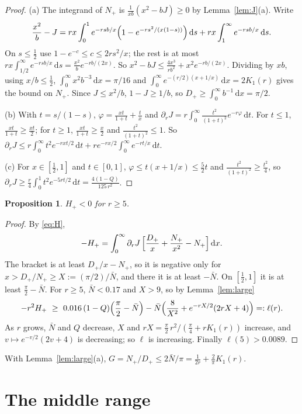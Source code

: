\documentclass[11pt]{amsart}
\newtheorem{proposition}[theorem]{Proposition}
\theoremstyle{remark}
\numberwithin{equation}{section}
\newcommand{\dd}{\,\mathrm{d}}
\begin{document}
\begin{proof}
(a) The integrand of $N_+$ is $\frac1{xb}(x^2-bJ)\ge0$ by Lemma~\ref{lem:J}(a). Write
\[
\frac{x^2}b-J=rx\int_0^1e^{-rsb/x}\Bigl(1-e^{-rs^2/(x(1-s))}\Bigr)\dd s+rx\int_1^\infty e^{-rsb/x}\dd s .
\]
On $s\le\frac12$ use $1-e^{-c}\le c\le2rs^2/x$; the rest is at most $rx\int_{1/2}^\infty e^{-rsb/x}\dd s=\frac{x^2}be^{-rb/(2x)}$. So $x^2-bJ\le\frac{4x^3}{rb^2}+x^2e^{-rb/(2x)}$. Dividing by $xb$, using $x/b\le\frac12$, $\int_0^\infty x^2b^{-3}\dd x=\pi/16$ and $\int_0^\infty e^{-(r/2)(x+1/x)}\dd x=2K_1(r)$ gives the bound on $N_+$. Since $J\le x^2/b$, $1-J\ge1/b$, so $D_+\ge\int_0^\infty b^{-1}\dd x=\pi/2$.

(b) With $t=s/(1-s)$, $\varphi=\frac{xt}{1+t}+\frac tx$ and $\partial_rJ=r\int_0^\infty\frac{t^2}{(1+t)^2}e^{-r\varphi}\dd t$. For $t\le1$, $\frac{xt}{1+t}\ge\frac{xt}2$; for $t\ge1$, $\frac{xt}{1+t}\ge\frac x2$ and $\frac{t^2}{(1+t)^2}\le1$. So $\partial_rJ\le r\int_0^\infty t^2e^{-rxt/2}\dd t+re^{-rx/2}\int_0^\infty e^{-rt/x}\dd t$.

(c) For $x\in[\frac12,1]$ and $t\in[0,1]$, $\varphi\le t(x+1/x)\le\frac52t$ and $\frac{t^2}{(1+t)^2}\ge\frac{t^2}4$, so $\partial_rJ\ge\frac r4\int_0^1t^2e^{-5rt/2}\dd t=\frac{4(1-Q)}{125\,r^2}$.
\end{proof}

\begin{proposition}\label{prop:large}
$H_+<0$ for $r\ge5$.
\end{proposition}

\begin{proof}
By \eqref{eq:H},
\[
-H_+=\int_0^\infty\partial_rJ\,\Bigl[\frac{D_+}x+\frac{N_+}{x^2}-N_+\Bigr]\dd x .
\]
The bracket is at least $D_+/x-N_+$, so it is negative only for $x>D_+/N_+\ge X:=(\pi/2)/\bar N$, and there it is at least $-\bar N$. On $[\frac12,1]$ it is at least $\frac\pi2-\bar N$. For $r\ge5$, $\bar N<0.17$ and $X>9$, so by Lemma~\ref{lem:large}
\[
-r^2H_+\ \ge\ 0.016\,(1-Q)\Bigl(\frac\pi2-\bar N\Bigr)-\bar N\Bigl(\frac8{X^2}+e^{-rX/2}(2rX+4)\Bigr)=:\ell(r).
\]
As $r$ grows, $\bar N$ and $Q$ decrease, $X$ and $rX=\frac\pi2\,r^2/(\frac\pi4+rK_1(r))$ increase, and $v\mapsto e^{-v/2}(2v+4)$ is decreasing; so $\ell$ is increasing. Finally $\ell(5)>0.0089$.
\end{proof}

With Lemma~\ref{lem:large}(a), $G=N_+/D_+\le2\bar N/\pi=\frac1{2r}+\frac2\pi K_1(r)$.

\section{The middle range}\label{sec:middle}
\end{document}
